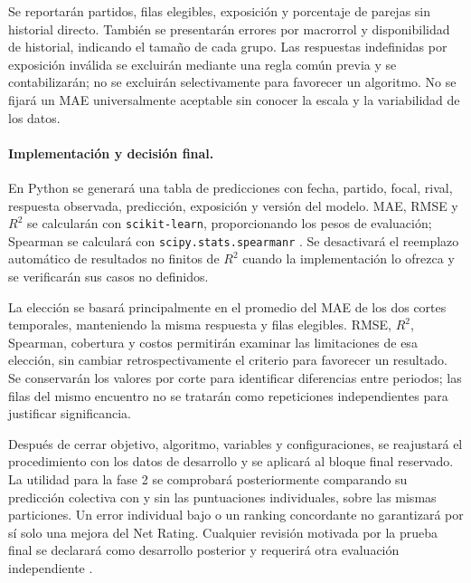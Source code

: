 Se reportarán partidos, filas elegibles, exposición y porcentaje de parejas sin historial directo. También se presentarán errores por macrorrol y disponibilidad de historial, indicando el tamaño de cada grupo. Las respuestas indefinidas por exposición inválida se excluirán mediante una regla común previa y se contabilizarán; no se excluirán selectivamente para favorecer un algoritmo. No se fijará un MAE universalmente aceptable sin conocer la escala y la variabilidad de los datos.

\paragraph*{Implementación y decisión final.}
En Python se generará una tabla de predicciones con fecha, partido, focal, rival, respuesta observada, predicción, exposición y versión del modelo. MAE, RMSE y $R^2$ se calcularán con \texttt{scikit-learn}, proporcionando los pesos de evaluación; Spearman se calculará con \texttt{scipy.stats.spearmanr} \cite{sklearnMetricas6161,scipySpearman6161}. Se desactivará el reemplazo automático de resultados no finitos de $R^2$ cuando la implementación lo ofrezca y se verificarán sus casos no definidos.

La elección se basará principalmente en el promedio del MAE de los dos cortes temporales, manteniendo la misma respuesta y filas elegibles. RMSE, $R^2$, Spearman, cobertura y costos permitirán examinar las limitaciones de esa elección, sin cambiar retrospectivamente el criterio para favorecer un resultado. Se conservarán los valores por corte para identificar diferencias entre periodos; las filas del mismo encuentro no se tratarán como repeticiones independientes para justificar significancia.

Después de cerrar objetivo, algoritmo, variables y configuraciones, se reajustará el procedimiento con los datos de desarrollo y se aplicará al bloque final reservado. La utilidad para la fase 2 se comprobará posteriormente comparando su predicción colectiva con y sin las puntuaciones individuales, sobre las mismas particiones. Un error individual bajo o un ranking concordante no garantizará por sí solo una mejora del Net Rating. Cualquier revisión motivada por la prueba final se declarará como desarrollo posterior y requerirá otra evaluación independiente \cite{cawley2010selection}.
